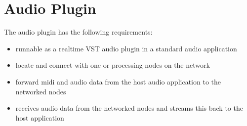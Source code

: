 \section{Audio Plugin}

The audio plugin has the following requirements:

\begin{itemize}

\item runnable as a realtime VST audio plugin in a standard audio application
\item locate and connect with one or processing nodes on the network
\item forward midi and audio data from the host audio application to the networked nodes
\item receives audio data from the networked nodes and streams this back to the host application

\end{itemize}
